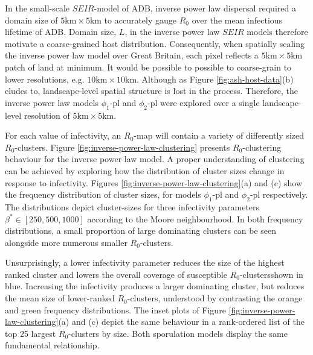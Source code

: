 In the small-scale $SEIR$-model of ADB, inverse power law dispersal required a domain size of $\mathrm{5km \times 5km}$ to accurately gauge $R_0$ over the mean infectious lifetime of ADB.
Domain size, $L$, in the inverse power law $SEIR$ models therefore motivate a coarse-grained host distribution.
Consequently, when spatially scaling the inverse power law model over Great Britain, each pixel reflects a $\mathrm{5km \times 5km}$ patch of land at minimum.
It would be possible to possible to coarse-grain to lower resolutions, e.g. $\mathrm{10km \times 10km}$.
Although as Figure \ref{fig:ash-host-data}(b) eludes to, landscape-level spatial structure is lost in the process.
Therefore, the inverse power law models $\phi_1$-pl and $\phi_2$-pl were explored over a single landscape-level resolution of $\mathrm{5km \times 5km}$.

For each value of infectivity, an $R_0$-map will contain a variety of differently sized $R_0$-clusters.
Figure \ref{fig:inverse-power-law-clustering} presents $R_0$-clustering behaviour for the inverse power law model.
A proper understanding of clustering can be achieved by exploring how the distribution of cluster sizes change in response to infectivity. 
Figures \ref{fig:inverse-power-law-clustering}(a) and (c) show the frequency distribution of cluster sizes, 
for models $\phi_1$-pl and $\phi_2$-pl respectively.
The distributions depict cluster-sizes for three infectivity parameters $\beta^* \in [250, 500, 1000]$ according to the Moore neighbourhood.
In both frequency distributions, a small proportion of large dominating clusters can be seen alongside more numerous smaller $R_0$-clusters.

Unsurprisingly, a lower infectivity parameter reduces the size of the highest ranked cluster and lowers the overall coverage of susceptible $R_0$-clusters\textemdash shown in blue.
Increasing the infectivity produces a larger dominating cluster, but reduces the mean size of lower-ranked $R_0$-clusters, 
understood by contrasting the orange and green frequency distributions.
The inset plots of Figure \ref{fig:inverse-power-law-clustering}(a) and (c) depict the same behaviour in a rank-ordered list of the top 25 largest $R_0$-clusters by size.
Both sporulation models display the same fundamental relationship.

